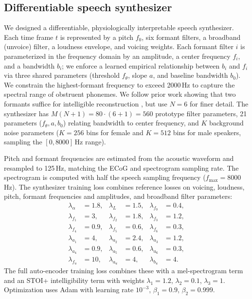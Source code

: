\documentclass[11pt]{article}
\begin{document}
\subsection{Differentiable speech synthesizer}
We designed a differentiable, physiologically interpretable speech synthesizer. Each time frame $t$ is represented by a pitch $f_0$, six formant filters, a broadband (unvoice) filter, a loudness envelope, and voicing weights. Each formant filter $i$ is parameterized in the frequency domain by an amplitude, a center frequency $f_i$, and a bandwidth $b_i$; we enforce a learned empirical relationship between $b_i$ and $f_i$ via three shared parameters (threshold $f_\theta$, slope $a$, and baseline bandwidth $b_0$). We constrain the highest-formant frequency to exceed 2000\,Hz to capture the spectral range of obstruent phonemes. We follow prior work showing that two formants suffice for intelligible reconstruction \cite{flanagan1980parametric}, but use $N=6$ for finer detail. The synthesizer has $M(N+1) = 80 \cdot (6+1) = 560$ prototype filter parameters, 21 parameters ($f_\theta,a,b_0$) relating bandwidth to center frequency, and $K$ background noise parameters ($K=256$ bins for female and $K=512$ bins for male speakers, sampling the $[0, 8000]$\,Hz range).

Pitch and formant frequencies are estimated from the acoustic waveform and resampled to 125\,Hz, matching the ECoG and spectrogram sampling rate. The spectrogram is computed with half the speech sampling frequency ($f_{\mathrm{max}} = 8000$\,Hz). The synthesizer training loss combines reference losses on voicing, loudness, pitch, formant frequencies and amplitudes, and broadband filter parameters:
\begin{align*}
\lambda_\alpha &= 1.8, & \lambda_L &= 1.5, & \lambda_{f_0} &= 0.4, \\
\lambda_{f_1} &= 3, & \lambda_{f_2} &= 1.8, & \lambda_{f_3} &= 1.2, \\
\lambda_{f_4} &= 0.9, & \lambda_{f_5} &= 0.6, & \lambda_{f_6} &= 0.3, \\
\lambda_{a_1} &= 4, & \lambda_{a_2} &= 2.4, & \lambda_{a_3} &= 1.2, \\
\lambda_{a_4} &= 0.9, & \lambda_{a_5} &= 0.6, & \lambda_{a_6} &= 0.3, \\
\lambda_{f_u} &= 10, & \lambda_{a_u} &= 4, & \lambda_{b_u} &= 4.
\end{align*}
The full auto-encoder training loss combines these with a mel-spectrogram term and an STOI+ intelligibility term with weights $\lambda_1 = 1.2$, $\lambda_2 = 0.1$, $\lambda_3 = 1$. Optimization uses Adam \cite{kingma2014adam} with learning rate $10^{-3}$, $\beta_1 = 0.9$, $\beta_2 = 0.999$.
\end{document}
